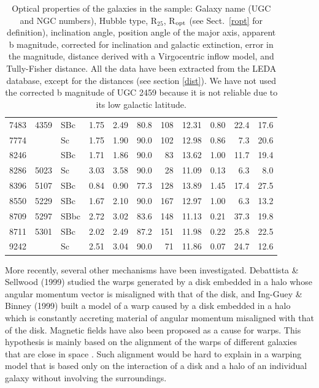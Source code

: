 \documentclass{aa}
\begin{document}
\begin{center}
\begin{table}
\begin{center}
\begin{tabular}{cclcccrccrr}
7483 &   4359  &  SBc    	 &  1.75 &  2.49 &  80.8 &  108 &  12.31 &  0.80 &  22.4 &  17.6 \\
7774 &   &  Sc     	 &  1.75 &  1.90 &  90.0 &  102 &  12.98 &  0.86 &  7.3 &  20.6 \\
8246 &   &  SBc    	 &  1.71 &  1.86 &  90.0 &  83 &  13.62 &  1.00 &  11.7 &  19.4 \\
8286 &   5023  &  Sc     	 &  3.03 &  3.58 &  90.0 &  28 &  11.09 &  0.13 &  6.3 &  8.0 \\
8396 &   5107  &  SBc    	 &  0.84 &  0.90 &  77.3 &  128 &  13.89 &  1.45 &  17.4 &  27.5 \\
8550 &   5229  &  SBc    	 &  1.67 &  2.10 &  90.0 &  167 &  12.97 &  1.00 &  6.3 &  13.2 \\
8709 &   5297  &  SBbc   	 &  2.72 &  3.02 &  83.6 &  148 &  11.13 &  0.21 &  37.3 &  19.8 \\
8711 &   5301  &  SBc    	 &  2.02 &  2.49 &  87.2 &  151 &  11.98 &  0.22 &  25.8 &  22.5 \\
9242 &   &  Sc     	 &  2.51 &  3.04 &  90.0 &  71 &  11.86 &  0.07 &  24.7 &  12.6 \\
\hline
\end{tabular}
\caption{Optical properties of the galaxies in the sample: Galaxy name
  (UGC and NGC numbers), Hubble type, R$_{25}$, R$_{\rm opt}$ (see
  Sect.~\ref{ropt} for definition), inclination angle, position angle of
  the major axis, apparent b magnitude, corrected for inclination and
  galactic extinction, error in the magnitude, distance derived with a
  Virgocentric inflow model, and Tully-Fisher distance. All the data
  have been extracted from the LEDA database, except for the distances
  (see section \ref{dist}). We have not used the corrected b magnitude
  of UGC 2459 because it is not reliable due to its low galactic
  latitude.}
\label{tab:opt0}
\end{center}
\end{table}
\end{center}


More recently, several other mechanisms have been investigated. Debattista
\& Sellwood (1999) studied the warps generated by a disk
embedded in a halo whose angular momentum vector is misaligned with
that of the disk, and Ing-Guey \& Binney (1999) built a
model of a warp caused by a disk embedded in a halo which is
constantly accreting material of angular momentum misaligned
with that of the disk. Magnetic fields have also been proposed as a
cause for warps. This hypothesis is mainly  based on the alignment of
the warps of different galaxies that are close in space
\cite{bat}. Such alignment would be hard to explain in a warping model
that is based only on the interaction of a disk and a halo of an individual
galaxy without involving the surroundings.
\end{document}
